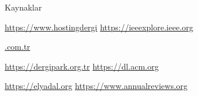 \documentclass{beamer}                                                                                          %
\begin{document}
\begin{frame}{Kaynaklar}
        
        \color{myred1} \color{black} \href{https://www.hostingdergi.com.tr/yapay-zeka-ve-sinir-aglari/}{https://www.hostingdergi}\hspace{33}
        \color{myred1} \color{black} \href{https://ieeexplore.ieee.org/abstract/document/7586590}{https://ieeexplore.ieee.org}\par
        \hspace{12}\href{https://www.hostingdergi.com.tr/yapay-zeka-ve-sinir-aglari/}{.com.tr}\par
        
        
        \color{myred1} \color{black} \href{https://dergipark.org.tr/en/download/article-file/596690}{ https://dergipark.org.tr}\hspace{43}
        \color{myred1} \color{black} \href{https://dl.acm.org/doi/abs/10.1145/2976749.2978318}{https://dl.acm.org}\par\vspace{15}
        
        
        \color{myred1} \color{black} \href{https://elyadal.org/pivolka/06/PiVOLKA_06_05.pdf}{https://elyadal.org}\hspace{65}
        \color{myred1} \color{black} \href{https://www.annualreviews.org/doi/abs/10.1146/annurev-biodatasci-080917-013343}{https://www.annualreviews.org}\par\vspace{15}
    \end{frame}
    
    
\end{document}
